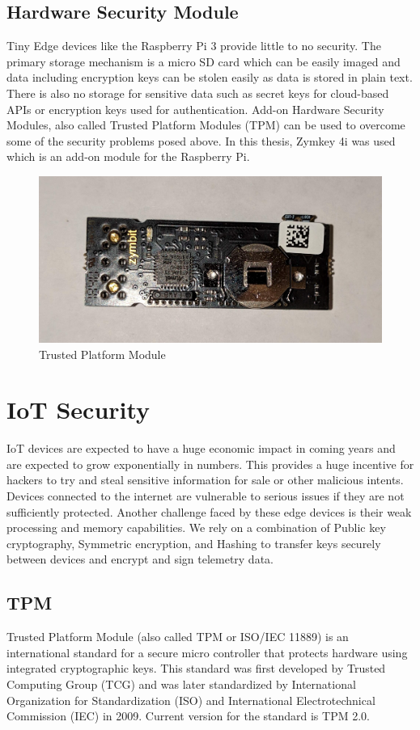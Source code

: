 \documentclass[11pt,openright]{report}
\begin{document}
\subsection{Hardware Security Module}
Tiny Edge devices like the Raspberry Pi 3 provide little to no security.
The primary storage mechanism is a micro SD card which can be easily imaged and data including encryption keys can be stolen easily as data is stored in plain text. There is also no storage for sensitive data such as secret keys for cloud-based APIs or encryption keys used for authentication. Add-on Hardware Security Modules, also called Trusted Platform Modules (TPM) can be used to overcome some of the security problems posed above. In this thesis, Zymkey 4i was used which is an add-on module for the Raspberry Pi.

\begin{figure}
    \centering
    \includegraphics[scale=0.1]{images/tpm.jpg}
    \caption{Trusted Platform Module}
    \label{fig:tpm}
\end{figure}


\section{IoT Security}
IoT devices are expected to have a huge economic impact in coming years and are expected to grow exponentially in numbers. This provides a huge incentive for hackers to try and steal sensitive information for sale or other malicious intents. Devices connected to the internet are vulnerable to serious issues if they are not sufficiently protected. Another challenge faced by these edge devices is their weak processing and memory capabilities. We rely on a combination of Public key cryptography, Symmetric encryption, and Hashing to transfer keys securely between devices and encrypt and sign telemetry data. 

\subsection{TPM}
Trusted Platform Module (also called TPM or ISO/IEC 11889) \cite{article} is an international standard for a secure micro controller that protects hardware using integrated cryptographic keys. This standard was first developed by Trusted Computing Group (TCG) and was later standardized by International Organization for Standardization (ISO) and International Electrotechnical Commission (IEC) in 2009. Current version for the standard is TPM 2.0.
\end{document}
